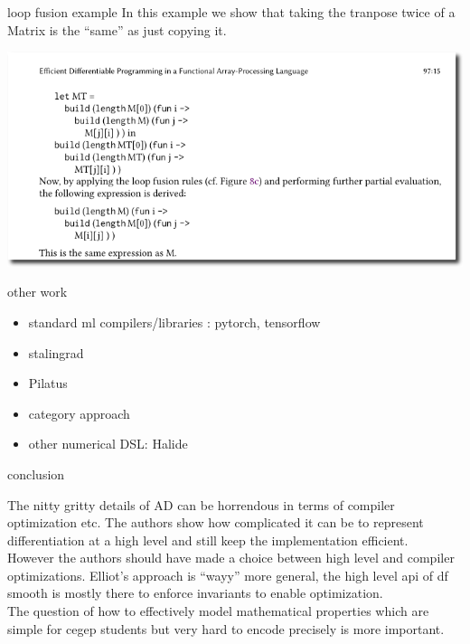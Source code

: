\documentclass[smaller]{beamer}
\begin{document}
\begin{frame}{loop fusion example}
  In this example we show that taking the tranpose twice of
  a Matrix is the ``same'' as just copying it.
  \begin{center}
    \includegraphics[width=.9\linewidth]{matrixtranspose.png}
  \end{center}
\end{frame}

\begin{frame}{other work}
  \begin{itemize}
    \item standard ml compilers/libraries : pytorch, tensorflow
    \item stalingrad
    \item Pilatus
    \item  category approach
    \item other numerical DSL: Halide
  \end{itemize}
\end{frame}

\begin{frame}{conclusion}

  The nitty gritty details of AD can be horrendous in terms of compiler
  optimization etc. The authors show how complicated it can be to represent
  differentiation at a high level and still keep the implementation efficient.\\[1ex]


  However the authors should have made a choice between high level and compiler
  optimizations. Elliot's approach is ``wayy'' more general, the high level api
  of df smooth is mostly there to enforce invariants to enable optimization.\\[1ex]


  The question of how to effectively model mathematical properties which are
  simple for cegep students but very hard to encode precisely is more important.

\end{frame}
\end{document}
